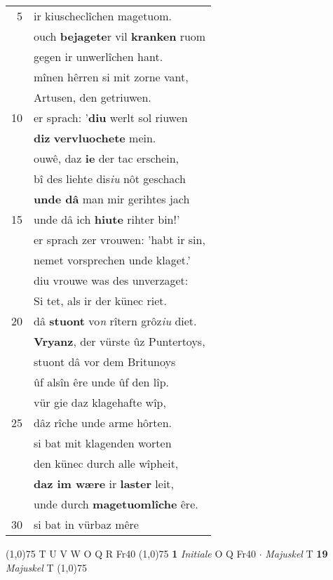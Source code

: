 \documentclass[8pt,a4paper,notitlepage]{article}
\begin{document}
\begin{table}[ht]
\begin{minipage}[t]{0.5\linewidth}
\begin{tabular}{rl}
5 & ir kiuscheclîchen magetuom.\\ 
 & ouch \textbf{bejagete}r vil \textbf{kranken} ruom\\ 
 & gegen ir unwerlîchen hant.\\ 
 & mînen hêrren si mit zorne vant,\\ 
 & Artusen, den getriuwen.\\ 
10 & er sprach: '\textbf{diu} werlt sol riuwen\\ 
 & \textbf{diz} \textbf{vervluochete} mein.\\ 
 & ouwê, daz \textbf{ie} der tac erschein,\\ 
 & bî des liehte dis\textit{iu} nôt geschach\\ 
 & \textbf{unde dâ} man mir gerihtes jach\\ 
15 & unde dâ ich \textbf{hiute} rihter bin!'\\ 
 & er sprach zer vrouwen: 'habt ir sin,\\ 
 & nemet vorsprechen unde klaget.'\\ 
 & diu vrouwe was des unverzaget:\\ 
 & Si tet, als ir der künec riet.\\ 
20 & dâ \textbf{stuont} vo\textit{n} rîtern grôz\textit{iu} diet.\\ 
 & \textbf{Vryanz}, der vürste ûz Puntertoys,\\ 
 & stuont dâ vor dem Britunoys\\ 
 & ûf alsîn êre unde ûf den lîp.\\ 
 & vür gie daz klagehafte wîp,\\ 
25 & dâz rîche unde arme hôrten.\\ 
 & si bat mit klagenden worten\\ 
 & den künec durch alle wîpheit,\\ 
 & \textbf{daz im wære} ir \textbf{laster} leit,\\ 
 & unde durch \textbf{magetuomlîche} êre.\\ 
30 & si bat in vürbaz mêre\\ 
\end{tabular}
\scriptsize
\line(1,0){75} \newline
T U V W O Q R Fr40 \newline
\line(1,0){75} \newline
\textbf{1} \textit{Initiale} O Q Fr40   $\cdot$ \textit{Majuskel} T  \textbf{19} \textit{Majuskel} T  \newline
\line(1,0){75} \newline

\end{minipage}
\end{table}
\end{document}
